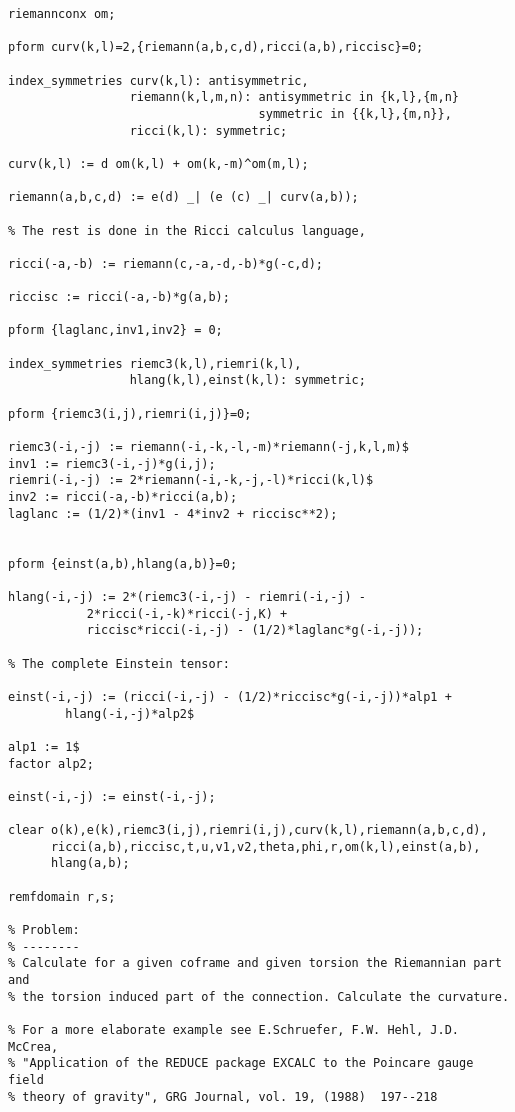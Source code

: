 {\begin{verbatim}
riemannconx om;

pform curv(k,l)=2,{riemann(a,b,c,d),ricci(a,b),riccisc}=0;

index_symmetries curv(k,l): antisymmetric,
                 riemann(k,l,m,n): antisymmetric in {k,l},{m,n}
                                   symmetric in {{k,l},{m,n}},
                 ricci(k,l): symmetric;

curv(k,l) := d om(k,l) + om(k,-m)^om(m,l);

riemann(a,b,c,d) := e(d) _| (e (c) _| curv(a,b));

% The rest is done in the Ricci calculus language,

ricci(-a,-b) := riemann(c,-a,-d,-b)*g(-c,d);

riccisc := ricci(-a,-b)*g(a,b);

pform {laglanc,inv1,inv2} = 0;

index_symmetries riemc3(k,l),riemri(k,l),
                 hlang(k,l),einst(k,l): symmetric;

pform {riemc3(i,j),riemri(i,j)}=0;

riemc3(-i,-j) := riemann(-i,-k,-l,-m)*riemann(-j,k,l,m)$
inv1 := riemc3(-i,-j)*g(i,j);
riemri(-i,-j) := 2*riemann(-i,-k,-j,-l)*ricci(k,l)$
inv2 := ricci(-a,-b)*ricci(a,b);
laglanc := (1/2)*(inv1 - 4*inv2 + riccisc**2);


pform {einst(a,b),hlang(a,b)}=0;

hlang(-i,-j) := 2*(riemc3(-i,-j) - riemri(-i,-j) -
		   2*ricci(-i,-k)*ricci(-j,K) +
		   riccisc*ricci(-i,-j) - (1/2)*laglanc*g(-i,-j));

% The complete Einstein tensor: 

einst(-i,-j) := (ricci(-i,-j) - (1/2)*riccisc*g(-i,-j))*alp1 +
		hlang(-i,-j)*alp2$

alp1 := 1$
factor alp2;

einst(-i,-j) := einst(-i,-j);

clear o(k),e(k),riemc3(i,j),riemri(i,j),curv(k,l),riemann(a,b,c,d),
      ricci(a,b),riccisc,t,u,v1,v2,theta,phi,r,om(k,l),einst(a,b),
      hlang(a,b);

remfdomain r,s; 

% Problem:
% --------
% Calculate for a given coframe and given torsion the Riemannian part and
% the torsion induced part of the connection. Calculate the curvature.

% For a more elaborate example see E.Schruefer, F.W. Hehl, J.D. McCrea,
% "Application of the REDUCE package EXCALC to the Poincare gauge field
% theory of gravity", GRG Journal, vol. 19, (1988)  197--218


\end{verbatim}}
